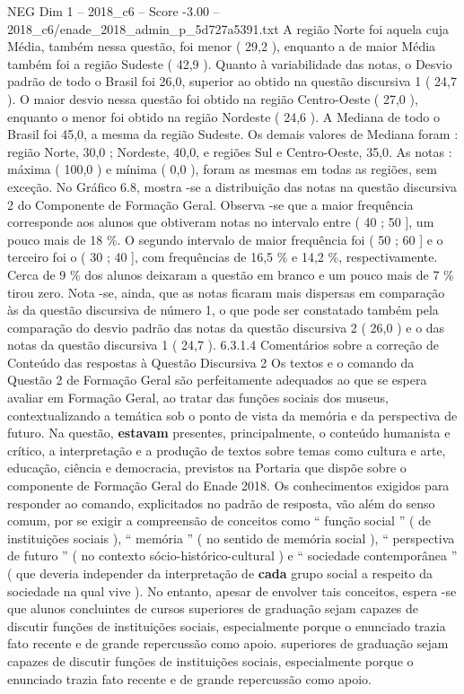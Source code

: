 \begin{textsample}{NEG Dim 1 – 2018\_c6 – Score -3.00 – 2018\_c6/enade\_2018\_admin\_p\_5d727a5391.txt}
A região Norte foi aquela cuja Média, também nessa questão, foi menor ( 29,2 ), enquanto a de maior Média também foi a região Sudeste ( 42,9 ).
Quanto à variabilidade das notas, o Desvio padrão de todo o Brasil foi 26,0, superior ao obtido na questão discursiva 1 ( 24,7 ).
O maior desvio nessa questão foi obtido na região Centro-Oeste ( 27,0 ), enquanto o menor foi obtido na região Nordeste ( 24,6 ).
A Mediana de todo o Brasil foi 45,0, a mesma da região Sudeste.
Os demais valores de Mediana foram : região Norte, 30,0 ; Nordeste, 40,0, e regiões Sul e Centro-Oeste, 35,0.
As notas : máxima ( 100,0 ) e mínima ( 0,0 ), foram as mesmas em todas as regiões, sem exceção.
No Gráfico 6.8, mostra -se a distribuição das notas na questão discursiva 2 do Componente de Formação Geral.
Observa -se que a maior frequência corresponde aos alunos que obtiveram notas no intervalo entre ( 40 ; 50 ], um pouco mais de 18 \%.
O segundo intervalo de maior frequência foi ( 50 ; 60 ] e o terceiro foi o ( 30 ; 40 ], com frequências de 16,5 \% e 14,2 \%, respectivamente.
Cerca de 9 \% dos alunos deixaram a questão em branco e um pouco mais de 7 \% tirou zero.
Nota -se, ainda, que as notas ficaram mais dispersas em comparação às da questão discursiva de número 1, o que pode ser constatado também pela comparação do desvio padrão das notas da questão discursiva 2 ( 26,0 ) e o das notas da questão discursiva 1 ( 24,7 ). 6.3.1.4 Comentários sobre a correção de Conteúdo das respostas à Questão Discursiva 2 Os textos e o comando da Questão 2 de Formação Geral são perfeitamente adequados ao que se espera avaliar em Formação Geral, ao tratar das funções sociais dos museus, contextualizando a temática sob o ponto de vista da memória e da perspectiva de futuro.
Na questão, \textbf{estavam} presentes, principalmente, o conteúdo humanista e crítico, a interpretação e a produção de textos sobre temas como cultura e arte, educação, ciência e democracia, previstos na Portaria que dispõe sobre o componente de Formação Geral do Enade 2018.
Os conhecimentos exigidos para responder ao comando, explicitados no padrão de resposta, vão além do senso comum, por se exigir a compreensão de conceitos como “ função social ” ( de instituições sociais ), “ memória ” ( no sentido de memória social ), “ perspectiva de futuro ” ( no contexto sócio-histórico-cultural ) e “ sociedade contemporânea ” ( que deveria independer da interpretação de \textbf{cada} grupo social a respeito da sociedade na qual vive ).
No entanto, apesar de envolver tais conceitos, espera -se que alunos concluintes de cursos superiores de graduação sejam capazes de discutir funções de instituições sociais, especialmente porque o enunciado trazia fato recente e de grande repercussão como apoio. superiores de graduação sejam capazes de discutir funções de instituições sociais, especialmente porque o enunciado trazia fato recente e de grande repercussão como apoio.

\end{textsample}
